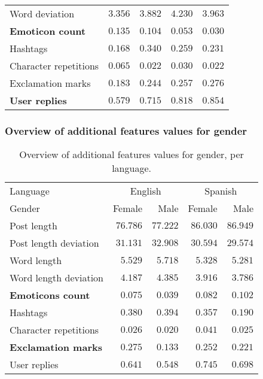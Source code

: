 \documentclass[utf8]{beamer}
\begin{document}
\begin{frame}
{\begin{table}
\begin{center}
\begin{tabular}{l|rrrr}
			Word deviation  & $ 3.356 $ & $ 3.882 $ & $ 4.230 $ & $ 3.963 $ \\
			\textbf{Emoticon count}  & $ 0.135 $ & $ 0.104 $ & $ 0.053 $ & $ 0.030 $ \\
			Hashtags  & $ 0.168 $ & $ 0.340 $ & $ 0.259 $ & $ 0.231 $ \\
			Character repetitions  & $ 0.065 $ & $ 0.022 $ & $ 0.030 $ & $ 0.022 $ \\
			Exclamation marks & $ 0.183 $ & $ 0.244 $ & $ 0.257 $ & $ 0.276 $ \\
			\textbf{User replies} & $ 0.579 $ & $ 0.715 $ & $ 0.818 $ & $ 0.854 $ \\
			\bottomrule
			\end{tabular}
			\end{center}
		\end{table}
	}
\end{frame}

\begin{frame}
	\frametitle{Overview of additional features values for gender}
	\begin{table}
		\caption{Overview of additional features values for gender, per language.}
		\label{tab:additionalfeatures-gender}
		\begin{center}
			\begin{tabular}{l|rr|rr}
				\toprule
				Language & \multicolumn{2}{c|}{English} & \multicolumn{2}{c}{Spanish}  \\
				Gender & Female & Male & Female & Male \\
				\midrule
				Post length & $ 76.786 $ & $ 77.222 $ & $ 86.030 $ & $ 86.949 $ \\
				Post length deviation & $ 31.131 $ & $ 32.908 $ & $ 30.594 $ & $ 29.574 $ \\
				Word length & $ 5.529 $ & $ 5.718 $ & $ 5.328 $ & $ 5.281 $  \\
				Word length deviation & $ 4.187 $ & $ 4.385 $ & $ 3.916 $ & $ 3.786 $ \\
				\textbf{Emoticons count} & $ 0.075 $ & $ 0.039 $ & $ 0.082 $ & $ 0.102 $ \\
				Hashtags &  $ 0.380 $ & $ 0.394 $ & $ 0.357 $ & $ 0.190 $ \\
				Character repetitions & $ 0.026 $ & $ 0.020 $ & $ 0.041 $ & $ 0.025 $ \\
				\textbf{Exclamation marks} & $ 0.275 $ & $ 0.133 $ & $ 0.252 $ & $ 0.221 $\\
				User replies & $ 0.641 $ & $ 0.548 $ & $ 0.745 $ & $ 0.698 $ \\
				\bottomrule
			\end{tabular}
		\end{center}
	\end{table}
\end{frame}
\end{document}
